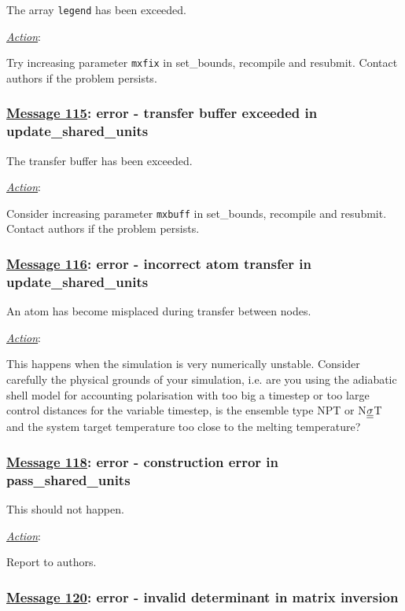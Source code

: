 The array {\tt legend} has been exceeded.

\noindent \underline{\em Action}:

Try increasing parameter {\tt mxfix} in {\sc set\_bounds},
recompile and resubmit.  Contact \D authors if the problem
persists.

\subsubsection*{\underline{Message 115}: error - transfer buffer exceeded in update\_shared\_units}

The transfer buffer has been exceeded.

\noindent \underline{\em Action}:

Consider increasing parameter {\tt mxbuff} in {\sc set\_bounds},
recompile and resubmit.  Contact \D authors if the problem
persists.

\subsubsection*{\underline{Message 116}: error - incorrect atom transfer in update\_shared\_units}

An atom has become misplaced during transfer between nodes.

\noindent \underline{\em Action}:

This happens when the simulation is very numerically unstable.
Consider carefully the physical grounds of your simulation, i.e.
are you using the adiabatic shell model for accounting polarisation
with too big a timestep or too large control distances for the
variable timestep, is the ensemble type NPT or N$\mbox{$\underline{\underline{\bf \sigma}}$}$T and
the system target temperature too close to the melting temperature?

\subsubsection*{\underline{Message 118}: error - construction error in pass\_shared\_units}

This should not happen.

\noindent \underline{\em Action}:

Report to authors.

\subsubsection*{\underline{Message 120}: error - invalid determinant in matrix inversion}

